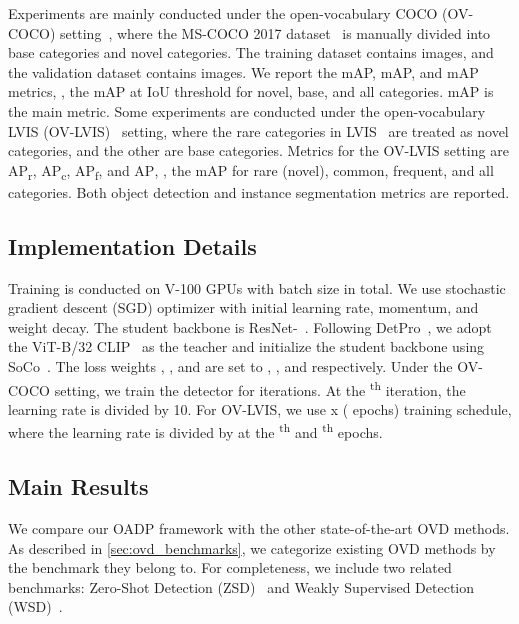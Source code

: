 \documentclass[10pt,twocolumn,letterpaper]{article}
\makeatletter
\newcommand{\@mAP}[2]{mAP}
\newcommand{\@AP}[1]{AP\textsubscript{#1}}
\newcommand{\mAPN}[1]{\@mAP{N}{#1}}
\newcommand{\mAPB}[1]{\@mAP{B}{#1}}
\newcommand{\mAP}[1]{\@mAP{}{#1}}
\def\APr{\@AP{r}}
\def\APc{\@AP{c}}
\def\APf{\@AP{f}}
\def\AP{\@AP{}}
\makeatother
\begin{document}
Experiments are mainly conducted under the open-vocabulary COCO (OV-COCO) setting~\cite{ovr_cnn}, where the MS-COCO 2017 dataset~\cite{coco} is manually divided into  base categories and  novel categories.
The training dataset contains  images, and the validation dataset contains  images.
We report the \mAPN{50}, \mAPB{50}, and \mAP{50} metrics, \ie, the mAP at IoU threshold  for novel, base, and all categories.
\mAPN{} is the main metric.
Some experiments are conducted under the open-vocabulary LVIS (OV-LVIS)~\cite{vild} setting, where the  rare categories in LVIS~\cite{lvis} are treated as novel categories, and the other  are base categories.
Metrics for the OV-LVIS setting are \APr, \APc, \APf, and \AP, \ie, the mAP for rare (novel), common, frequent, and all categories.
Both object detection and instance segmentation metrics are reported.
 
\subsection{Implementation Details}

Training is conducted on  V-100 GPUs with batch size  in total.
We use stochastic gradient descent (SGD) optimizer with  initial learning rate,  momentum, and  weight decay.
The student backbone is ResNet-~\cite{resnet}.
Following DetPro~\cite{detpro}, we adopt the ViT-B/32 CLIP~\cite{clip} as the teacher and initialize the student backbone using SoCo~\cite{soco}.
The loss weights , , and  are set to , , and  respectively.
Under the OV-COCO setting, we train the detector for  iterations.
At the \textsuperscript{th} iteration, the learning rate is divided by 10.
For OV-LVIS, we use x ( epochs) training schedule, where the learning rate is divided by  at the \textsuperscript{th} and \textsuperscript{th} epochs.
 
\subsection{Main Results}

We compare our OADP framework with the other state-of-the-art OVD methods.
As described in \cref{sec:ovd_benchmarks}, we categorize existing OVD methods by the benchmark they belong to.
For completeness, we include two related benchmarks: Zero-Shot Detection (ZSD)~\cite{zsd, Rahman2020, gtnet, Huang2021a, Li2019c} and Weakly Supervised Detection (WSD)~\cite{wsdnn, cap2det}.
\end{document}
